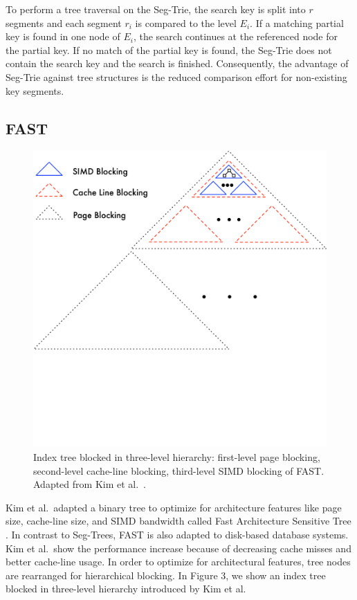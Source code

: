 \documentclass[runningheads,a4paper]{llncs}
\begin{document}
To perform a tree traversal on the Seg-Trie, the search key is split into $r$ segments and each segment $r_i$ is compared to the level $E_i$. If a matching partial key is found in one node of $E_i$, the search continues at the referenced node for the partial key. If no match of the partial key is found, the Seg-Trie does not contain the search key and the search is finished. Consequently, the advantage of Seg-Trie against tree structures is the reduced comparison effort for non-existing key segments. 


\subsection{FAST}\label{SCM}
\begin{figure} \vspace{-40pt}
  \begin{center}
	\includegraphics[width=.46\textwidth]{FAST}\vspace{-60pt}
	\caption{Index tree blocked in three-level hierarchy: first-level page blocking, second-level cache-line blocking, third-level SIMD blocking of FAST. Adapted from Kim et al.\ \cite{kim2010fast}.}
	\label{fast}  
	\end{center}\vspace{-30pt}
\end{figure}Kim et al.\ adapted a binary tree to optimize for architecture features like page size, cache-line size, and SIMD bandwidth called Fast Architecture Sensitive Tree \cite{kim2010fast}. In contrast to Seg-Trees, FAST is also adapted to disk-based database systems. Kim et al.\ show the performance increase because of decreasing cache misses and better cache-line usage. In order to optimize for architectural features, tree nodes are rearranged for hierarchical blocking. In Figure 3, we show an index tree blocked in three-level hierarchy introduced by Kim et al.\ 
\end{document}
